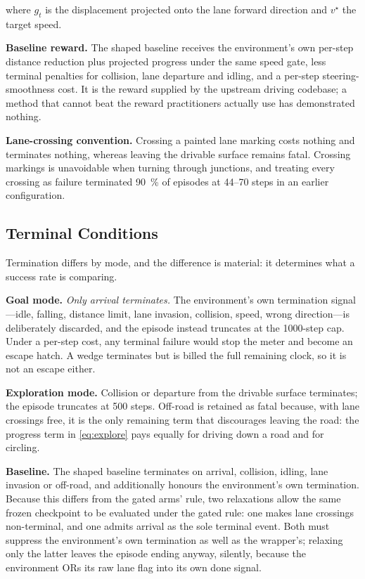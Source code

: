 where $g_t$ is the displacement projected onto the lane forward direction and
$v^\star$ the target speed.

\textbf{Baseline reward.} The shaped baseline receives the environment's own
per-step distance reduction plus projected progress under the same speed gate,
less terminal penalties for collision, lane departure and idling, and a per-step
steering-smoothness cost. It is the reward supplied by the upstream driving
codebase; a method that cannot beat the reward practitioners actually use has
demonstrated nothing.

\textbf{Lane-crossing convention.} Crossing a painted lane marking costs nothing
and terminates nothing, whereas leaving the drivable surface remains fatal.
Crossing markings is unavoidable when turning through junctions, and treating
every crossing as failure terminated \SI{90}{\percent} of episodes at
\numrange{44}{70} steps in an earlier configuration.

\subsection{Terminal Conditions}
\label{sec:setup:terminal}

Termination differs by mode, and the difference is material: it determines what
a success rate is comparing.

\textbf{Goal mode.} \emph{Only arrival terminates.} The environment's own
termination signal---idle, falling, distance limit, lane invasion, collision,
speed, wrong direction---is deliberately discarded, and the episode instead
truncates at the \num{1000}-step cap. Under a per-step cost, any terminal
failure would stop the meter and become an escape hatch. A wedge terminates but
is billed the full remaining clock, so it is not an escape either.

\textbf{Exploration mode.} Collision or departure from the drivable surface
terminates; the episode truncates at \num{500} steps. Off-road is retained as
fatal because, with lane crossings free, it is the only remaining term that
discourages leaving the road: the progress term in \eqref{eq:explore} pays
equally for driving down a road and for circling.

\textbf{Baseline.} The shaped baseline terminates on arrival, collision, idling,
lane invasion or off-road, and additionally honours the environment's own
termination. Because this differs from the gated arms' rule, two relaxations
allow the same frozen checkpoint to be evaluated under the gated rule: one makes
lane crossings non-terminal, and one admits arrival as the sole terminal event.
Both must suppress the environment's own termination as well as the wrapper's;
relaxing only the latter leaves the episode ending anyway, silently, because the
environment ORs its raw lane flag into its own done signal.

